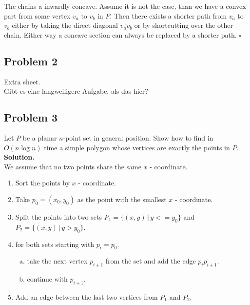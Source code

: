 \documentclass[11pt,a4paper,ngerman]{article}
\begin{document}
\begin{enumerate}[(i)]
        The chains a inwardly concave. Assume it is not the case, than we have a convex part from some vertex $v_a$ to $v_b$ in $P$. Then
        there exists a shorter path from $v_a$ to $v_b$ either by taking the direct diagonal $\overline{v_a v_b}$ or by shortcutting over
        the other chain. Either way a concave section can always be replaced by a shorter path.
        \mbox{} \hfill $\square$
\end{enumerate}

\subsection*{Problem 2}

Extra sheet.\\

Gibt es eine langweiligere Aufgabe, als das hier?

\subsection*{Problem 3}

Let $P$ be a planar $n$-point set in general position. Show how to find in $O(n \log n)$ time a simple polygon
whose vertices are exactly the points in $P$.\\

\textbf{Solution.}\\

We assume that no two points share the same $x$ - coordinate.

\begin{enumerate}[1.]
    \item Sort the points by $x$ - coordinate.
    \item Take $p_0 = (x_0, y_0)$ as the point with the smallest $x$ - coordinate.
    \item Split the points into two sets $P_1 = \{ (x,y) \, | \, y <= y_0 \}$
        and $P_2 = \{ (x,y) \, | \, y > y_0 \}$.
    \item for both sets starting with $p_i = p_0$.
        \begin{enumerate}[a.]
            \item take the next vertex $p_{i+1}$ from the set and add the
                edge $\overline{p_ip_{i+1}}$.
            \item continue with $p_{i+1}$.
        \end{enumerate}
    \item Add an edge between the last two vertices from $P_1$ and $P_2$.
\end{enumerate}
\end{document}
